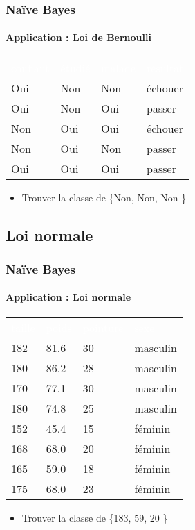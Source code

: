 \documentclass[xcolor=table]{beamer}
\begin{document}
\begin{frame}
	\frametitle{Naïve Bayes}
	\framesubtitle{Application : Loi de Bernoulli}
	
	\scriptsize
	\begin{center}
		\begin{tabular}{llll}
			\rowcolor{darkblue}
			\textcolor{white}{confiant} & \textcolor{white}{étudié} & \textcolor{white}{malade} & \textcolor{white}{résultat} \\
			Oui & Non & Non & échouer \\
			Oui & Non & Oui & passer \\
			Non & Oui & Oui & échouer \\
			Non & Oui & Non & passer \\
			Oui & Oui & Oui & passer \\
		\end{tabular}
	\end{center}
	
	\begin{itemize}
		\item Trouver la classe de \{Non, Non, Non \}
	\end{itemize}
	
	
\end{frame}


\subsection{Loi normale}

\begin{frame}
	\frametitle{Naïve Bayes}
	\framesubtitle{Application : Loi normale}
	
	\scriptsize
	\begin{center}
		\begin{tabular}{llll}
			\rowcolor{darkblue}
			\textcolor{white}{taille} & \textcolor{white}{poids} & \textcolor{white}{pointure} & \textcolor{white}{sexe} \\
			182 & 81.6 & 30 & masculin\\
			180 & 86.2 & 28 & masculin\\
			170 & 77.1 & 30 & masculin\\
			180 & 74.8 & 25 & masculin\\
			152 & 45.4 & 15 & féminin\\
			168 & 68.0 & 20 & féminin\\
			165 & 59.0 & 18 & féminin\\
			175 & 68.0 & 23 & féminin\\
		\end{tabular}
	\end{center}
	
	\begin{itemize}
		\item Trouver la classe de \{183, 59, 20 \}
	\end{itemize}
	
	
\end{frame}

\end{document}
